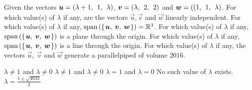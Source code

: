 
\begin{Exercise}[
name={},
title={}, 
difficulty=0,
origin={\cite{YL}}]
Given the vectors $\vec{u} = \rowvec{\lambda + 1,& 1,& \lambda}$, $\vec{v} = \rowvec{\lambda,& 2,& 2}$ and $\vec{w} = \rowvec{(1,& 1,& \lambda}$.
\Question For which value(s) of $\lambda$ if any, are the vectors $\vec{u}, \vec{v}$ and $\vec{w}$ linearly independent.
\Question For which value(s) of $\lambda$ if any, $\text{span}\left(\mbox{$\left\{\hspace{0.1em}\bm{u},\;\bm{v},\;\bm{w}\hspace{0.1em}\right\}$}\right)=\mathbb{R}^3$.
\Question For which value(s) of $\lambda$ if any, $\text{span}\left(\mbox{$\left\{\hspace{0.1em}\bm{u},\;\bm{v},\;\bm{w}\hspace{0.1em}\right\}$}\right)$ is a plane through the origin.
\Question For which value(s) of $\lambda$ if any, $\text{span}\left(\mbox{$\left\{\hspace{0.1em}\bm{u},\;\bm{v},\;\bm{w}\hspace{0.1em}\right\}$}\right)$ is a line through the origin.
\Question For which value(s) of $\lambda$ if any, the vectors $\vec{u},\; \vec{v}$ and $\vec{w}$ generate a parallelpiped of volume $2016$.
\end{Exercise}

\begin{Answer}
\Question $\lambda\neq1$ and $\lambda\neq0$
\Question $\lambda\neq1$ and $\lambda\neq0$
\Question $\lambda=1$ and $\lambda=0$
\Question No such value of $\lambda$ exists.
\Question $\lambda=\frac{1\pm\sqrt{4033}}{2}$
\end{Answer}
